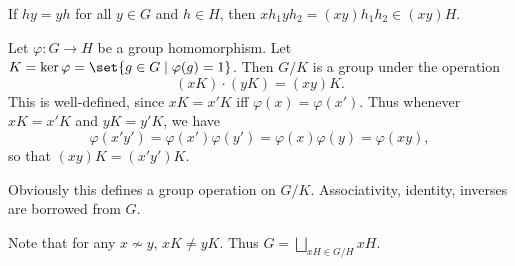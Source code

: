 If $hy = yh$ for all $y \in G$ and $h \in H$, then
$xh_1yh_2 = (xy)h_1h_2 \in (xy)H$.

\begin{example}
    Let $\varphi\colon G \to H$ be a group homomorphism.
    Let $K = \ker \varphi = \set{g \in G \mid \varphi(g) = 1}$.
    Then $G/K$ is a group under the operation \[
        (xK) \cdot (yK) = (xy)K.
    \] This is well-defined, since $xK = x'K$ iff
    $\varphi(x) = \varphi(x')$.
    Thus whenever $xK = x'K$ and $yK = y'K$, we have \[
        \varphi(x'y') = \varphi(x')\varphi(y')
            = \varphi(x)\varphi(y)
            = \varphi(xy),
    \]
    so that $(xy)K = (x'y')K$.

    Obviously this defines a group operation on $G/K$.
    Associativity, identity, inverses are borrowed from $G$.

    Note that for any $x \nsim y$, $xK \ne yK$.
    Thus $G = \bigsqcup_{xH \in G/H} xH$.
\end{example}
